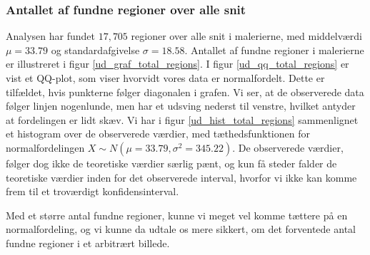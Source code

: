 {\subsubsection{Antallet af fundne regioner over alle snit}
Analysen har fundet $17,705$ regioner over alle snit i malerierne, med
middelværdi $\mu = 33.79$ og standardafgivelse $\sigma = 18.58$.
Antallet af fundne regioner i malerierne er illustreret i figur
\ref{ud_graf_total_regions}. I figur \ref{ud_qq_total_regions} er vist
et QQ-plot, som viser hvorvidt vores data er normalfordelt. Dette er
tilfældet, hvis punkterne følger diagonalen i grafen. Vi ser, at de
observerede data følger linjen nogenlunde, men har et udsving nederst
til venstre, hvilket antyder at fordelingen er lidt skæv. Vi har i figur
\ref{ud_hist_total_regions} sammenlignet et histogram over de
observerede værdier, med tæthedsfunktionen for normalfordelingen $X \sim
N(\mu = 33.79, \sigma^2 = 345.22)$. De observerede værdier, følger dog
ikke de teoretiske værdier særlig pænt, og kun få steder falder de
teoretiske værdier inden for det observerede interval, hvorfor vi ikke
kan komme frem til et troværdigt konfidensinterval.

Med et større antal fundne regioner, kunne vi meget vel komme tættere på
en normalfordeling, og vi kunne da udtale os mere sikkert, om det
forventede antal fundne regioner i et arbitrært billede.

}
